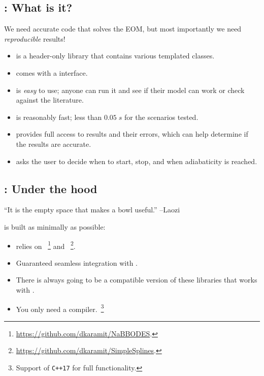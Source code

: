 \documentclass[10pt,utf8,compress,xcolor=dvipsnames]{beamer}
\begin{document}
\subsection{\mimes: What is it?}
\begin{frame}{\insertsubsectionhead}
	We need accurate code that solves the EOM, but most importantly we need {\sl reproducible} results! \\[0.2cm]
	
	\begin{itemize}
		\item \mimes is a \CPP header-only library that contains various templated classes. 
%		
		\item \mimes comes with a \PY interface.
%
		\item \mimes is {\sl easy} to use; anyone can run it and see if their model can work or check against the literature.
%
		\item \mimes is reasonably fast; less than $0.05 \; s$ for the scenarios tested.
%
		\item \mimes provides full access to results and their errors, which can help determine if the results are accurate.
%
		\item \mimes asks the user to decide when to start, stop, and when adiabaticity is reached.
	\end{itemize}
	
\end{frame}

\subsection{\mimes: Under the hood}
\begin{frame}{\insertsubsectionhead}
	\begin{center}
		``It is the empty space that makes a bowl useful.''
		\flushright --Laozi %
	\end{center}
	\mimes is built as minimally as possible:
	\\[0.3cm] 
	\begin{itemize}
		\item \mimes relies on ~\footnote{\fontF \href{https://github.com/dkaramit/NaBBODES}{https://github.com/dkaramit/NaBBODES}.} and ~\footnote{\fontF \href{https://github.com/dkaramit/SimpleSplines}{https://github.com/dkaramit/SimpleSplines}.}.
		\item Guaranteed seamless integration with \mimes.
		\item There is always going to be a compatible version of these libraries that works with \mimes.
		\item You only need a \CPP compiler.~\footnote{Support of {\tt C++17} for full functionality.}
	\end{itemize}	
		
\end{frame}
\end{document}
